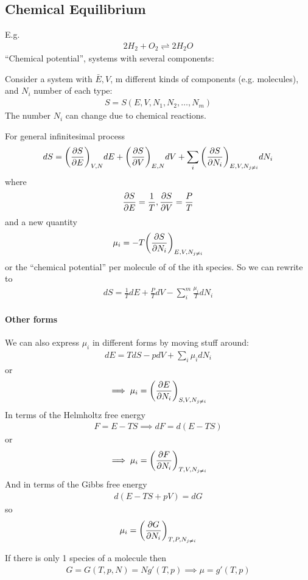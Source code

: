 \documentclass[../main.tex]{subfiles}
\begin{document}
\newpage
{}
\subsection{Chemical Equilibrium}
E.g. 
\begin{align*}
    2H_2 + O_2 \rightleftharpoons 2H_2O
\end{align*}
``Chemical potential'', systems with several components:

Consider a system with $\bar E, V$, m different kinds of components (e.g. molecules),
and $N_i$ number of each type:
\begin{align*}
    S = S(E, V, N_1, N_2, \dots, N_m)
\end{align*}
The number $N_i$ can change due to chemical reactions.

For general infinitesimal process
\begin{align*}
    dS = \qt(\pdv{S}{E})_{V, N} dE + \qt(\pdv{S}{V})_{E, N} dV + \sum_i \qt(\pdv{S}{N_i})_{E, V, N_{j\neq i}} dN_i
\end{align*}
where
\begin{align*}
    \pdv{S}{E} = \frac{1}{T}, \pdv{S}{V} = \frac{P}{T}
\end{align*}
and a new quantity
\begin{align*}
    \mu_i = - T \qt(\pdv{S}{N_i})_{E, V, N_{j\neq i}}
\end{align*}
or the ``chemical potential'' per molecule of of the ith species.
So we can rewrite to
\begin{align*}
    dS = \frac{1}{T} dE + \frac{P}{T} dV - \sum_i^m \frac{\mu_i}{T} dN_i
\end{align*}

\paragraph{Other forms} We can also express $\mu_i$ in different forms by moving stuff around:
\begin{align*}
    dE = T dS - p dV + \sum_i \mu_i dN_i
\end{align*}
or
\begin{align*}
    \implies \mu_i = \qt(\pdv{E}{N_i})_{S, V, N_{j\neq i}}
\end{align*}
In terms of the Helmholtz free energy
\begin{align*}
    F = E - TS \implies dF = d(E - TS)
\end{align*}
or
\begin{align*}
    \implies \mu_i = \qt(\pdv{F}{N_i})_{T, V, N_{j\neq i}}
\end{align*}
And in terms of the Gibbs free energy
\begin{align*}
    d(E - TS + pV) = dG
\end{align*}
so 
\begin{align*}
    \mu_i = \qt(\pdv{G}{N_i})_{T, P, N_{j\neq i}}
\end{align*}

If there is only 1 species of a molecule then
\begin{align*}
    G = G(T,p, N) = N g' (T,p) \implies \mu = g'(T,p)
\end{align*}
\end{document}
